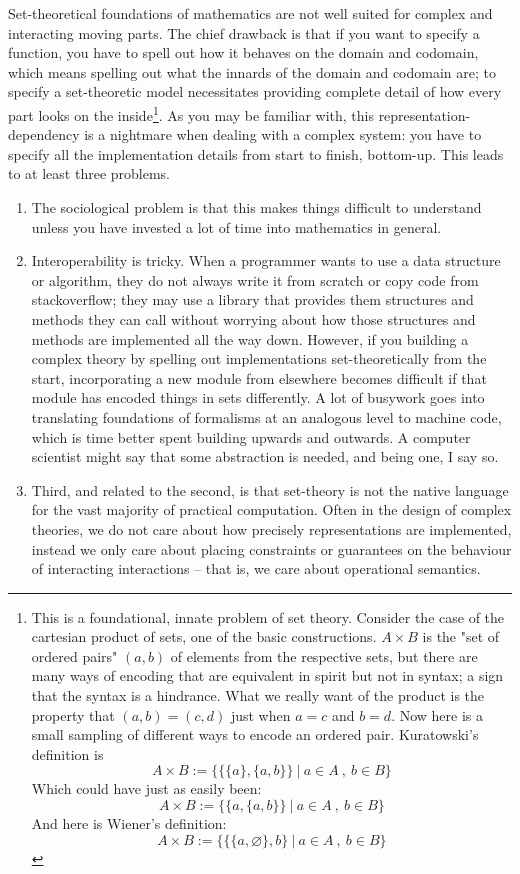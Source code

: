
Set-theoretical foundations of mathematics are not well suited for complex and interacting moving parts. The chief drawback is that if you want to specify a function, you have to spell out how it behaves on the domain and codomain, which means spelling out what the innards of the domain and codomain are; to specify a set-theoretic model necessitates providing complete detail of how every part looks on the inside\footnote{This is a foundational, innate problem of set theory. Consider the case of the cartesian product of sets, one of the basic constructions. $A \times B$ is the "set of ordered pairs" $(a,b)$ of elements from the respective sets, but there are many ways of encoding that are equivalent in spirit but not in syntax; a sign that the syntax is a hindrance. What we really want of the product is the property that $(a,b) = (c,d)$ just when $a = c$ and $b = d$. Now here is a small sampling of different ways to encode an ordered pair. Kuratowski's definition is
\[A \times B := \bigg\{ \{\{a\},\{a,b\}\} \ | \ a \in A \ , \ b \in B \bigg\}\]
Which could have just as easily been:
\[A \times B := \bigg\{ \{a,\{a,b\}\} \ | \ a \in A \ , \ b \in B \bigg\}\]
And here is Wiener's definition:
\[A \times B := \bigg\{ \{\{a,\varnothing\},b\} \ | \ a \in A \ , \ b \in B \bigg\}\]}. As you may be familiar with, this representation-dependency is a nightmare when dealing with a complex system: you have to specify all the implementation details from start to finish, bottom-up. This leads to at least three problems.
\begin{enumerate}
\item{
The sociological problem is that this makes things difficult to understand unless you have invested a lot of time into mathematics in general.
}
\item{
Interoperability is tricky. When a programmer wants to use a data structure or algorithm, they do not always write it from scratch or copy code from stackoverflow; they may use a library that provides them structures and methods they can call without worrying about how those structures and methods are implemented all the way down. However, if you building a complex theory by spelling out implementations set-theoretically from the start, incorporating a new module from elsewhere becomes difficult if that module has encoded things in sets differently. A lot of busywork goes into translating foundations of formalisms at an analogous level to machine code, which is time better spent building upwards and outwards. A computer scientist might say that some abstraction is needed, and being one, I say so.
}
\item{
Third, and related to the second, is that set-theory is not the native language for the vast majority of practical computation. Often in the design of complex theories, we do not care about how precisely representations are implemented, instead we only care about placing constraints or guarantees on the behaviour of interacting interactions -- that is, we care about operational semantics.
}
\end{enumerate}

